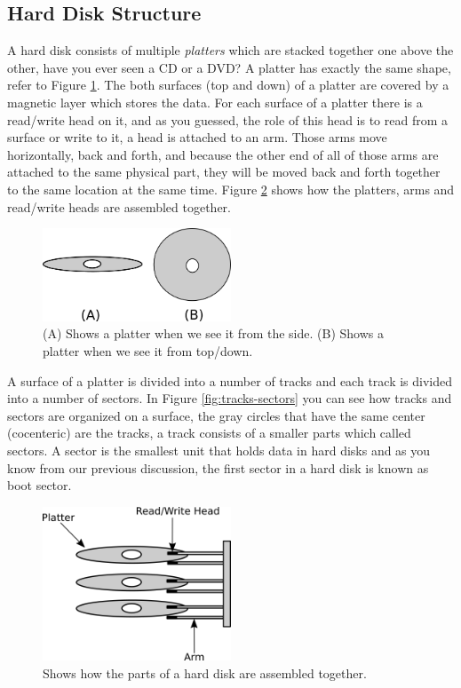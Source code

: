 \subsection{Hard Disk Structure}\label{hard-disk-structure}

A hard disk consists of multiple \emph{platters} which are stacked
together one above the other, have you ever seen a CD or a DVD? A
platter has exactly the same shape, refer to Figure \ref{fig:a-platter}.
The both surfaces (top and down) of a platter are covered by a magnetic
layer which stores the data. For each surface of a platter there is a
read/write head on it, and as you guessed, the role of this head is to
read from a surface or write to it, a head is attached to an arm. Those
arms move horizontally, back and forth, and because the other end of all
of those arms are attached to the same physical part, they will be moved
back and forth together to the same location at the same time. Figure
\ref{fig:platters-arms-heads} shows how the platters, arms and
read/write heads are assembled together.

\begin{figure}
\centering
\includegraphics[width=0.50000\textwidth]{Figures/bootloader-ch/a-platter.png}
\caption{(A) Shows a platter when we see it from the side. (B) Shows a
platter when we see it from top/down.}\label{fig:a-platter}
\end{figure}

A surface of a platter is divided into a number of tracks and each track
is divided into a number of sectors. In Figure \ref{fig:tracks-sectors}
you can see how tracks and sectors are organized on a surface, the gray
circles that have the same center (cocenteric) are the tracks, a track
consists of a smaller parts which called sectors. A sector is the
smallest unit that holds data in hard disks and as you know from our
previous discussion, the first sector in a hard disk is known as boot
sector.

\begin{figure}
\centering
\includegraphics[width=0.50000\textwidth]{Figures/bootloader-ch/platters-arms-heads.png}
\caption{Shows how the parts of a hard disk are assembled
together.}\label{fig:platters-arms-heads}
\end{figure}

